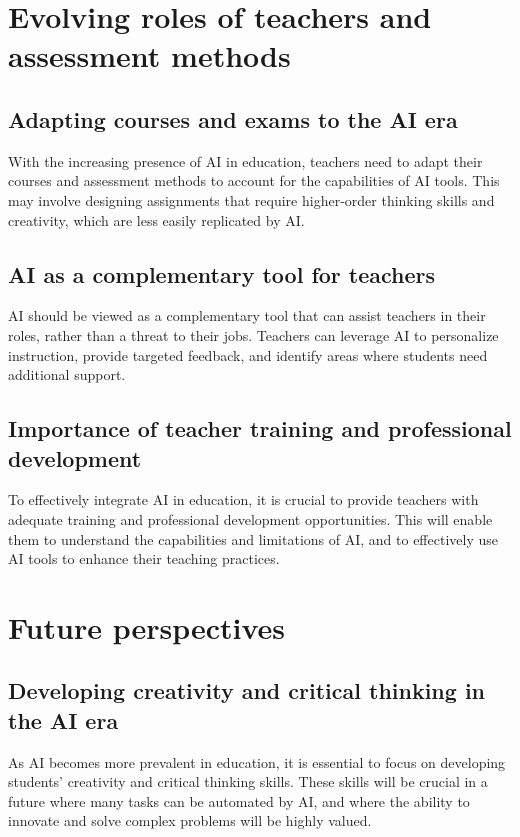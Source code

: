 \documentclass{article}
\begin{document}
\section{Evolving roles of teachers and assessment methods}

\subsection{Adapting courses and exams to the AI era}
With the increasing presence of AI in education, teachers need to adapt their courses and assessment methods to account for the capabilities of AI tools. This may involve designing assignments that require higher-order thinking skills and creativity, which are less easily replicated by AI.

\subsection{AI as a complementary tool for teachers}
AI should be viewed as a complementary tool that can assist teachers in their roles, rather than a threat to their jobs. Teachers can leverage AI to personalize instruction, provide targeted feedback, and identify areas where students need additional support.

\subsection{Importance of teacher training and professional development}
To effectively integrate AI in education, it is crucial to provide teachers with adequate training and professional development opportunities. This will enable them to understand the capabilities and limitations of AI, and to effectively use AI tools to enhance their teaching practices.

\section{Future perspectives}

\subsection{Developing creativity and critical thinking in the AI era}
As AI becomes more prevalent in education, it is essential to focus on developing students' creativity and critical thinking skills. These skills will be crucial in a future where many tasks can be automated by AI, and where the ability to innovate and solve complex problems will be highly valued.
\end{document}
